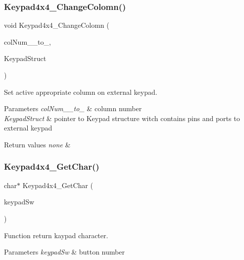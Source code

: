\subsubsection{\texorpdfstring{Keypad4x4\+\_\+\+Change\+Colomn()}{Keypad4x4\_ChangeColomn()}}
{\footnotesize\ttfamily void Keypad4x4\+\_\+\+Change\+Colomn (\begin{DoxyParamCaption}\item[{uint8\+\_\+t}]{col\+Num\+\_\+\_\+to\+\_,  }\item[{\hyperlink{struct_keypad___wires_type_def}{Keypad\+\_\+\+Wires\+Type\+Def} $\ast$}]{Keypad\+Struct }\end{DoxyParamCaption})}



Set active appropriate column on external keypad. 


\begin{DoxyParams}{Parameters}
{\em col\+Num\+\_\+\_\+to\+\_} & column number \\
\hline
{\em Keypad\+Struct} & pointer to Keypad structure witch contains pins and ports to external keypad \\
\hline
\end{DoxyParams}

\begin{DoxyRetVals}{Return values}
{\em none} & \\
\hline
\end{DoxyRetVals}
\mbox{\label{group___key_pad___functions_ga3df556ff06c042ed56d225250acb88bf}} 
\subsubsection{\texorpdfstring{Keypad4x4\+\_\+\+Get\+Char()}{Keypad4x4\_GetChar()}}
{\footnotesize\ttfamily char$\ast$ Keypad4x4\+\_\+\+Get\+Char (\begin{DoxyParamCaption}\item[{uint8\+\_\+t}]{keypad\+Sw }\end{DoxyParamCaption})}



Function return kaypad character. 


\begin{DoxyParams}{Parameters}
{\em keypad\+Sw} & button number \\
\hline
\end{DoxyParams}

